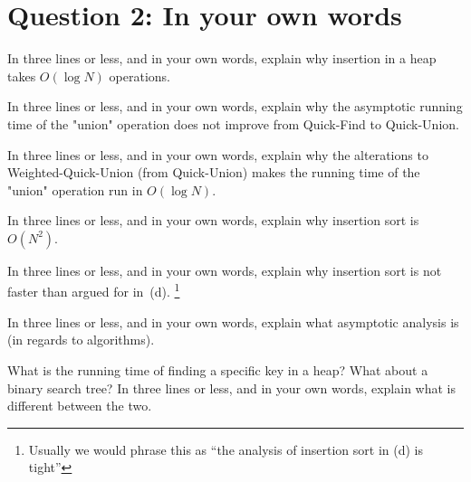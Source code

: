 \documentclass{tufte-handout}
\begin{document}
\section{\textbf{Question 2}: In your own words}
\begin{description}

  \medskip\item[(a)]
  In three lines or less, and in your own words, explain why insertion in a heap takes $O(\log N)$ operations.
  \medskip\item[(b)]
  In three lines or less, and in your own words, explain why the asymptotic running time of the "union" operation does not improve from Quick-Find to Quick-Union.
    \medskip\item[(c)]
    In three lines or less, and in your own words, explain why the alterations to Weighted-Quick-Union (from Quick-Union) makes the running time of the "union" operation run in $O(\log N)$.
    \medskip\item[(d)]
    In three lines or less, and in your own words, explain why insertion sort is $O(N^2)$.
    \medskip\item[(e)]
    In three lines or less, and in your own words, explain why insertion sort is not faster than argued for in~(d).
    \footnote{Usually we would phrase this as ``the analysis of insertion sort in (d) is tight''}
    \medskip\item[(f)]
    In three lines or less, and in your own words, explain what asymptotic analysis is (in regards to algorithms).
    \medskip\item[(g)]
    What is the running time of finding a specific key in a heap? What about a binary search tree? In three lines or less, and in your own words, explain what is different between the two.
\end{description}
\end{document}

